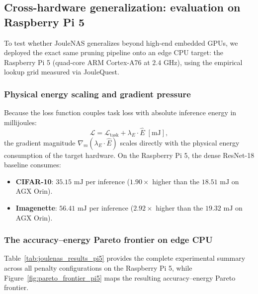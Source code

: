\subsection{Cross-hardware generalization: evaluation on Raspberry Pi 5}
\label{sec:pi5_experiments}

To test whether JouleNAS generalizes beyond high-end embedded GPUs, we deployed the exact same pruning pipeline onto an edge CPU target: the Raspberry Pi 5 (quad-core ARM Cortex-A76 at $2.4\text{ GHz}$), using the empirical lookup grid measured via JouleQuest.

\subsubsection{Physical energy scaling and gradient pressure}

Because the loss function couples task loss with absolute inference energy in millijoules:
\begin{equation}
\mathcal{L} = \mathcal{L}_{\text{task}} + \lambda_E \cdot \widehat{E}\;[\text{mJ}],
\end{equation}
the gradient magnitude $\nabla_m (\lambda_E \cdot \widehat{E})$ scales directly with the physical energy consumption of the target hardware.
On the Raspberry Pi 5, the dense ResNet-18 baseline consumes:
\begin{itemize}
    \item \textbf{CIFAR-10}: $35.15\text{ mJ}$ per inference ($1.90\times$ higher than the $18.51\text{ mJ}$ on AGX Orin).
    \item \textbf{Imagenette}: $56.41\text{ mJ}$ per inference ($2.92\times$ higher than the $19.32\text{ mJ}$ on AGX Orin).
\end{itemize}

\subsubsection{The accuracy--energy Pareto frontier on edge CPU}
\label{sec:pareto_frontier_pi5}

Table~\ref{tab:joulenas_results_pi5} provides the complete experimental summary across all penalty configurations on the Raspberry Pi 5, while Figure~\ref{fig:pareto_frontier_pi5} maps the resulting accuracy--energy Pareto frontier.

